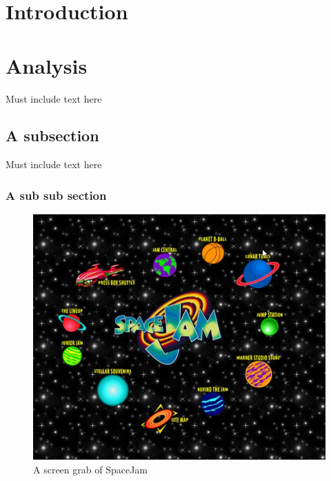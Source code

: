 \documentclass[12pt]{article}
\begin{document}




\formattingForRestOfReport
\section{Introduction}





\newpage
\section{Analysis} 


Must include text here
\subsection{A subsection}
Must include text here
\subsubsection{A sub sub section}

\begin{figure}[h!]
  \includegraphics[width=\textwidth]{SpaceJam.jpg}
  \caption{A screen grab of SpaceJam}
\end{figure}
\end{document}

